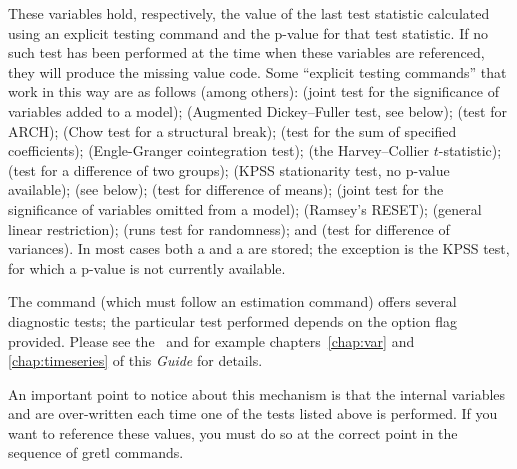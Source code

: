 These variables hold, respectively, the value of the last test
statistic calculated using an explicit testing command and the p-value
for that test statistic.  If no such test has been performed at the
time when these variables are referenced, they will produce the
missing value code.  Some ``explicit testing commands'' that work in
this way are as follows (among others):  (joint test for the
significance of variables added to a model);  (Augmented
Dickey--Fuller test, see below);  (test for ARCH);
 (Chow test for a structural break);  (test
for the sum of specified coefficients);  (Engle-Granger
cointegration test);  (the Harvey--Collier $t$-statistic);
 (test for a difference of two groups);  (KPSS
stationarity test, no p-value available);  (see below);
 (test for difference of means);  (joint test
for the significance of variables omitted from a model); 
(Ramsey's RESET);  (general linear restriction);
 (runs test for randomness); and  (test for
difference of variances). In most cases both a  and a
 are stored; the exception is the KPSS test, for which
a p-value is not currently available.

The  command (which must follow an estimation
command) offers several diagnostic tests; the particular test
performed depends on the option flag provided. Please see the \GCR\
and for example chapters~\ref{chap:var} and \ref{chap:timeseries} of
this \textit{Guide} for details.

An important point to notice about this mechanism is that the internal
variables \dollar{test} and \dollar{pvalue} are over-written each time
one of the tests listed above is performed.  If you want to reference
these values, you must do so at the correct point in the sequence of
gretl commands.


